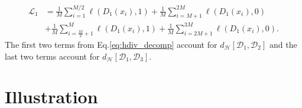 \documentclass{article}
\begin{document}
\begin{equation}\label{eq:hdiv_decomp}
\begin{split}
\mathcal{L}_1 &= \frac{1}{M} \sum_{i=1}^{M/2} \ell(D_1(x_i), 1) + \frac{1}{M} \sum_{i=M+1}^{2M} \ell(D_1(x_i), 0) \\ 
             &+ \frac{1}{M} \sum_{i=\frac{M}{2}+1}^{M} \ell(D_1(x_i), 1) + \frac{1}{M} \sum_{i=2M+1}^{3M} \ell(D_1(x_i), 0).
\end{split}
\end{equation}
The first two terms from Eq.\ref{eq:hdiv_decomp} account for $d_{\mathcal{H}}[\mathcal{D}_1, \mathcal{D}_2]$ and the last two terms account for $d_{\mathcal{H}}[\mathcal{D}_1, \mathcal{D}_3]$.

\section{Illustration}
\end{document}
